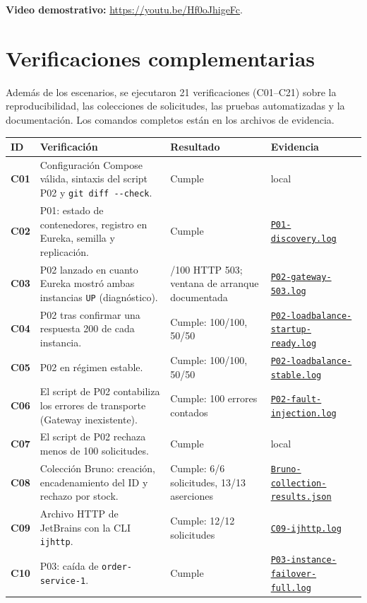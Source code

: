 \documentclass[
  spanish,
  a4paper,
  11pt
]{article}
\newcommand{\evid}[1]{\href{https://github.com/yan2005dris-afk/SDCC---microservices-with-gateway-and-loadbalancer/blob/develop/docs/evidencias/#1}{{\urlstyle{tt}\nolinkurl{#1}}}}
\begin{document}
\noindent\textbf{Video demostrativo:} \url{https://youtu.be/Hf0oJhigeFc}.

\appendix
\section{Verificaciones complementarias}\label{anexo-verificaciones}

Además de los escenarios, se ejecutaron 21 verificaciones (C01--C21) sobre la
reproducibilidad, las colecciones de solicitudes, las pruebas automatizadas y
la documentación. Los comandos completos están en los archivos de evidencia.

{\small
\renewcommand{\arraystretch}{1.25}
\begin{longtable}{>{\bfseries}p{} >{\raggedright\arraybackslash}p{} >{\raggedright\arraybackslash}p{} >{\raggedright\arraybackslash}p{}}
\toprule
\textbf{ID} & \textbf{Verificación} & \textbf{Resultado} & \textbf{Evidencia} \\
\midrule
\endhead
C01 & Configuración Compose válida, sintaxis del script P02 y \texttt{git diff -{}-check}. & Cumple & local \\
C02 & P01: estado de contenedores, registro en Eureka, semilla y replicación. & Cumple & \evid{P01-discovery.log} \\
C03 & P02 lanzado en cuanto Eureka mostró ambas instancias \texttt{UP} (diagnóstico). & 100/100 HTTP 503; ventana de arranque documentada & \evid{P02-gateway-503.log} \\
C04 & P02 tras confirmar una respuesta 200 de cada instancia. & Cumple: 100/100, 50/50 & \evid{P02-loadbalance-startup-ready.log} \\
C05 & P02 en régimen estable. & Cumple: 100/100, 50/50 & \evid{P02-loadbalance-stable.log} \\
C06 & El script de P02 contabiliza los errores de transporte (Gateway inexistente). & Cumple: 100 errores contados & \evid{P02-fault-injection.log} \\
C07 & El script de P02 rechaza menos de 100 solicitudes. & Cumple & local \\
C08 & Colección Bruno: creación, encadenamiento del ID y rechazo por stock. & Cumple: 6/6 solicitudes, 13/13 aserciones & \evid{Bruno-collection-results.json} \\
C09 & Archivo HTTP de JetBrains con la CLI \texttt{ijhttp}. & Cumple: 12/12 solicitudes & \evid{C09-ijhttp.log} \\
C10 & P03: caída de \texttt{order-service-1}. & Cumple & \evid{P03-instance-failover-full.log} \\

\end{longtable}}
\end{document}

